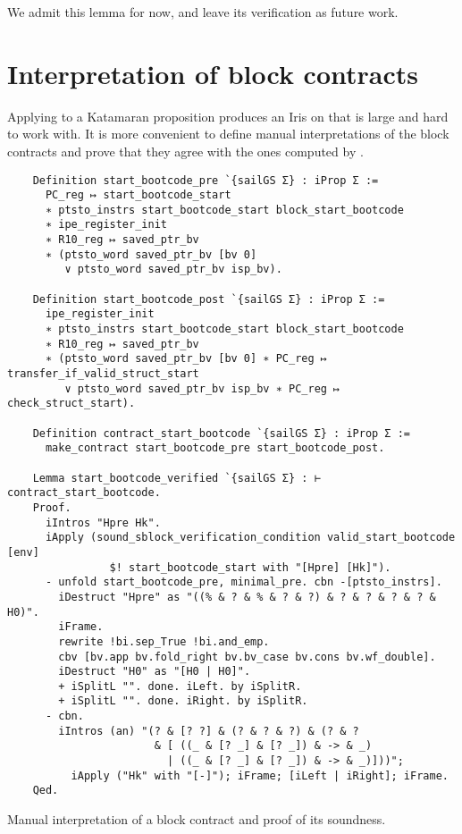 We admit this lemma for now, and leave its verification as future work.

\section{Interpretation of block contracts}

Applying  to a Katamaran proposition produces an Iris on that is large and hard to work with. It is more convenient to define manual interpretations of the block contracts and prove that they agree with the ones computed by .

\begin{listing}
  \begin{verbatim}
    Definition start_bootcode_pre `{sailGS Σ} : iProp Σ :=
      PC_reg ↦ start_bootcode_start
      ∗ ptsto_instrs start_bootcode_start block_start_bootcode
      ∗ ipe_register_init
      ∗ R10_reg ↦ saved_ptr_bv
      ∗ (ptsto_word saved_ptr_bv [bv 0]
         ∨ ptsto_word saved_ptr_bv isp_bv).

    Definition start_bootcode_post `{sailGS Σ} : iProp Σ :=
      ipe_register_init
      ∗ ptsto_instrs start_bootcode_start block_start_bootcode
      ∗ R10_reg ↦ saved_ptr_bv
      ∗ (ptsto_word saved_ptr_bv [bv 0] ∗ PC_reg ↦ transfer_if_valid_struct_start
         ∨ ptsto_word saved_ptr_bv isp_bv ∗ PC_reg ↦ check_struct_start).

    Definition contract_start_bootcode `{sailGS Σ} : iProp Σ :=
      make_contract start_bootcode_pre start_bootcode_post.

    Lemma start_bootcode_verified `{sailGS Σ} : ⊢ contract_start_bootcode.
    Proof.
      iIntros "Hpre Hk".
      iApply (sound_sblock_verification_condition valid_start_bootcode [env]
                $! start_bootcode_start with "[Hpre] [Hk]").
      - unfold start_bootcode_pre, minimal_pre. cbn -[ptsto_instrs].
        iDestruct "Hpre" as "((% & ? & % & ? & ?) & ? & ? & ? & ? & H0)".
        iFrame.
        rewrite !bi.sep_True !bi.and_emp.
        cbv [bv.app bv.fold_right bv.bv_case bv.cons bv.wf_double].
        iDestruct "H0" as "[H0 | H0]".
        + iSplitL "". done. iLeft. by iSplitR.
        + iSplitL "". done. iRight. by iSplitR.
      - cbn.
        iIntros (an) "(? & [? ?] & (? & ? & ?) & (? & ?
                       & [ ((_ & [? _] & [? _]) & -> & _)
                         | ((_ & [? _] & [? _]) & -> & _)]))";
          iApply ("Hk" with "[-]"); iFrame; [iLeft | iRight]; iFrame.
    Qed.
  \end{verbatim}
  \caption{Manual interpretation of a block contract and proof of its soundness.}
  \label{lst:start_bootcode_verified}
\end{listing}

